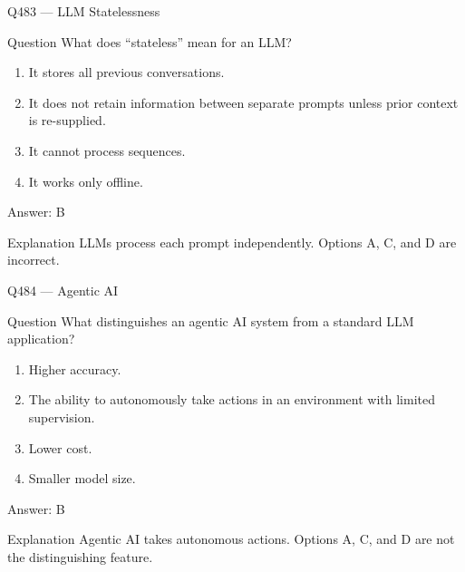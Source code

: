 \documentclass[aspectratio=169,8pt]{beamer}
\begin{document}
	\begin{frame}{Q483 --- LLM Statelessness}
		\begin{block}{Question}
			What does ``stateless'' mean for an LLM?
			\begin{enumerate}
				\item It stores all previous conversations.
				\item It does not retain information between separate prompts unless prior context is re-supplied.
				\item It cannot process sequences.
				\item It works only offline.
			\end{enumerate}
		\end{block}
		\begin{exampleblock}{Answer: B}\end{exampleblock}
		\begin{block}{Explanation}
			LLMs process each prompt independently. Options A, C, and D are incorrect.
		\end{block}
	\end{frame}
	
	\begin{frame}{Q484 --- Agentic AI}
		\begin{block}{Question}
			What distinguishes an agentic AI system from a standard LLM application?
			\begin{enumerate}
				\item Higher accuracy.
				\item The ability to autonomously take actions in an environment with limited supervision.
				\item Lower cost.
				\item Smaller model size.
			\end{enumerate}
		\end{block}
		\begin{exampleblock}{Answer: B}\end{exampleblock}
		\begin{block}{Explanation}
			Agentic AI takes autonomous actions. Options A, C, and D are not the distinguishing feature.
		\end{block}
	\end{frame}
	
\end{document}
